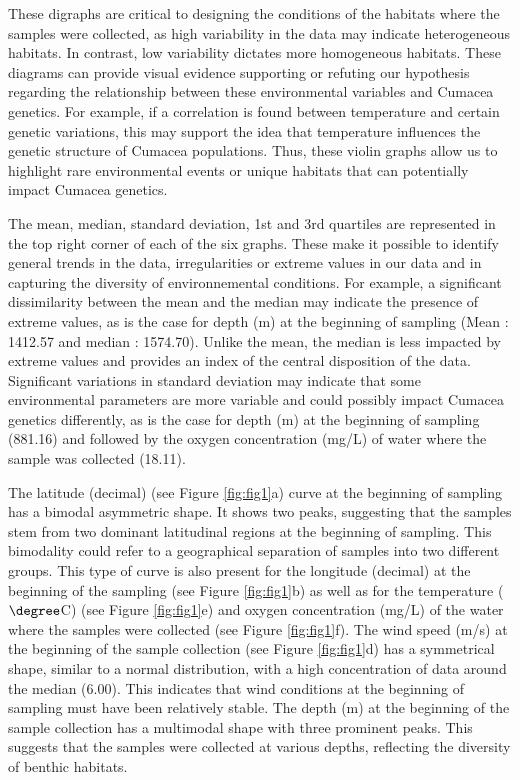 These digraphs are critical to designing the conditions of the habitats where the samples were collected, as high variability in the data may indicate heterogeneous habitats. In contrast, low variability dictates more homogeneous habitats. These diagrams can provide visual evidence supporting or refuting our hypothesis regarding the relationship between these environmental variables and Cumacea genetics. For example, if a correlation is found between temperature and certain genetic variations, this may support the idea that temperature influences the genetic structure of Cumacea populations. Thus, these violin graphs allow us to highlight rare environmental events or unique habitats that can potentially impact Cumacea genetics. 

The mean, median, standard deviation, 1st and 3rd quartiles are represented in the top right corner of each of the six graphs. These make it possible to identify general trends in the data, irregularities or extreme values in our data and in capturing the diversity of environnemental conditions. For example, a significant dissimilarity between the mean and the median may indicate the presence of extreme values, as is the case for depth (m) at the beginning of sampling (Mean : 1412.57 and median : 1574.70). Unlike the mean, the median is less impacted by extreme values and provides an index of the central disposition of the data. Significant variations in standard deviation may indicate that some environmental parameters are more variable and could possibly impact Cumacea genetics differently, as is the case for depth (m) at the beginning of sampling (881.16) and followed by the oxygen concentration (mg/L) of water where the sample was collected (18.11). 

The latitude (decimal) (see Figure \ref{fig:fig1}a) curve at the beginning of sampling has a bimodal asymmetric shape. It shows two peaks, suggesting that the samples stem from two dominant latitudinal regions at the beginning of sampling. This bimodality could refer to a geographical separation of samples into two different groups. This type of curve is also present for the longitude (decimal) at the beginning of the sampling (see Figure \ref{fig:fig1}b) as well as for the temperature ($\degree$C) (see Figure \ref{fig:fig1}e) and oxygen concentration (mg/L) of the water where the samples were collected (see Figure \ref{fig:fig1}f). The wind speed (m/s) at the beginning of the sample collection (see Figure \ref{fig:fig1}d) has a symmetrical shape, similar to a normal distribution, with a high concentration of data around the median (6.00). This indicates that wind conditions at the beginning of sampling must have been relatively stable. The depth (m) at the beginning of the sample collection has a multimodal shape with three prominent peaks. This suggests that the samples were collected at various depths, reflecting the diversity of benthic habitats.

